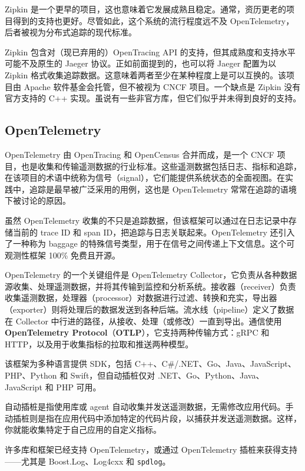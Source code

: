 \label{idx:1917}
Zipkin 是一个更早的项目，这也意味着它发展成熟且稳定。通常，资历更老的项目得到的支持也更好。尽管如此，这个系统的流行程度远不及 OpenTelemetry，后者被视为分布式追踪的现代标准。

Zipkin 包含对（现已弃用的）OpenTracing API 的支持，但其成熟度和支持水平可能不及原生的 Jaeger 协议。正如前面提到的，也可以将 Jaeger 配置为以 Zipkin 格式收集追踪数据。这意味着两者至少在某种程度上是可以互换的。该项目由 Apache 软件基金会托管，但不被视为 CNCF 项目。一个缺点是 Zipkin 没有官方支持的 C++ 实现。虽说有一些非官方库，但它们似乎并未得到良好的支持。

\subsection{OpenTelemetry}

\label{idx:1918}
OpenTelemetry 由 OpenTracing 和 OpenCensus 合并而成，是一个 CNCF 项目，也是收集和传输遥测数据的行业标准。这些遥测数据包括日志、指标和追踪，在该项目的术语中统称为信号（signal），它们能提供系统状态的全面视图。在实践中，追踪是最早被广泛采用的用例，这也是 OpenTelemetry 常常在追踪的语境下被讨论的原因。

虽然 OpenTelemetry 收集的不只是追踪数据，但该框架可以通过在日志记录中存储当前的 trace ID 和 span ID，把追踪与日志关联起来。OpenTelemetry 还引入了一种称为 baggage 的特殊信号类型，用于在信号之间传递上下文信息。这个可观测性框架 100\% 免费且开源。


\label{idx:1919}
OpenTelemetry 的一个关键组件是 OpenTelemetry Collector，它负责从各种数据源收集、处理遥测数据，并将其传输到监控和分析系统。接收器（receiver）负责收集遥测数据，处理器（processor）对数据进行过滤、转换和充实，导出器（exporter）则将处理后的数据发送到各种后端。流水线（pipeline）定义了数据在 Collector 中行进的路径，从接收、处理（或修改）一直到导出。通信使用 \textbf{OpenTelemetry Protocol}（\textbf{OTLP}），它支持两种传输方式：gRPC 和 HTTP，以及用于收集指标的拉取和推送两种模型。

该框架为多种语言提供 SDK，包括 C++、C\#/.NET、Go、Java、JavaScript、PHP、Python 和 Swift，但自动插桩仅对 .NET、Go、Python、Java、JavaScript 和 PHP 可用。

自动插桩是指使用库或 agent 自动收集并发送遥测数据，无需修改应用代码。手动插桩则是指在应用代码中添加特定的代码片段，以捕获并发送遥测数据。这样，你就能收集特定于自己应用的自定义指标。

许多库和框架已经支持 OpenTelemetry，或通过 OpenTelemetry 插桩来获得支持——尤其是 Boost.Log、Log4cxx 和 \texttt{spdlog}。

